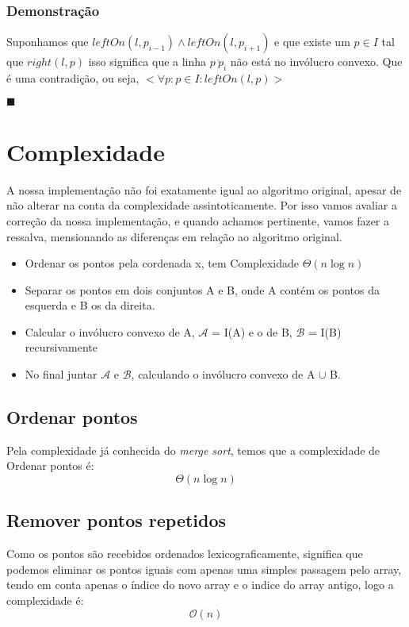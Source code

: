 \documentclass[11pt]{article}
\begin{document}
\subsubsection{Demonstração}
Suponhamos que $leftOn(l, p_{i-1}) \wedge leftOn(l, p_{i+1})$ 
e que existe um $p \in I$ tal que $right(l, p)$
isso significa que a linha $\overline{p\ p_i}$ não está no invólucro convexo.
Que é uma contradição, ou seja, $<\forall p : p \in I : leftOn(l, p)>$

\hfill $\blacksquare$


\section{Complexidade}
A nossa implementação não foi exatamente igual ao algoritmo original,
apesar de não alterar na conta da complexidade assintoticamente.
Por isso vamos avaliar a correção da nossa implementação, e quando 
achamos pertinente, vamos fazer a ressalva, mensionando as diferenças 
em relação ao algoritmo original.

\begin{itemize}
    \item Ordenar os pontos pela cordenada x, tem Complexidade $\Theta(n\log{}n)$
    \item Separar os pontos em dois conjuntos A e B, onde A contém os pontos da esquerda e B os da direita.
    \item Calcular o invólucro convexo de A, $\mathcal{A}$ = I(A) e o de B, $\mathcal{B}$ = I(B) recursivamente
    \item No final juntar $\mathcal{A}$ e $\mathcal{B}$, calculando o invólucro convexo de A $\cup$ B.
\end{itemize}

\subsection{Ordenar pontos}
Pela complexidade já conhecida do \textit{merge sort}, 
temos que a complexidade de Ordenar pontos é:
$$\Theta(n\log{}n)$$

\subsection{Remover pontos repetidos}
Como os pontos são recebidos ordenados lexicograficamente,
significa que podemos eliminar os pontos iguais com apenas
uma simples passagem pelo array, tendo em conta apenas o 
índice do novo array e o indice do array antigo, logo a 
complexidade é:
$$\mathcal{O}(n)$$
\end{document}
